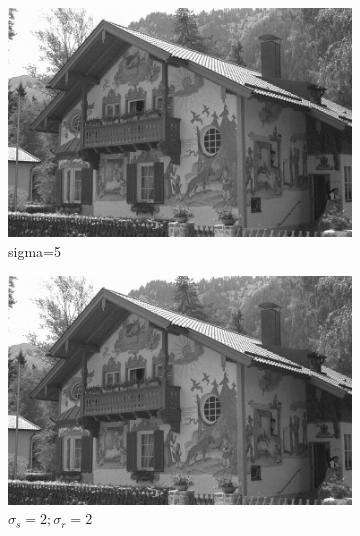 \documentclass[12pt]{article}
\begin{document}
\begin{figure}[h]
    \centering
    \begin{subfigure}[b]{0.24\textwidth}
        \centering
        \includegraphics[width=\textwidth]{../images/noisy_kodak24.png}
        \caption{sigma=5}
        \label{Noisy (sigma=5)}
    \end{subfigure}
    \begin{subfigure}[b]{0.24\textwidth}
        \centering
        \includegraphics[width=\textwidth]{../images/filtered_kodak24_meanshift_sigma_s_2_sigma_r_2.png}
        \caption{$\sigma_s=2;\sigma_r=2$}
        \label{fig:subfig2}
    \end{subfigure}
    \begin{subfigure}[b]{0.24\textwidth}
        \centering

\end{subfigure}
\end{figure}
\end{document}
